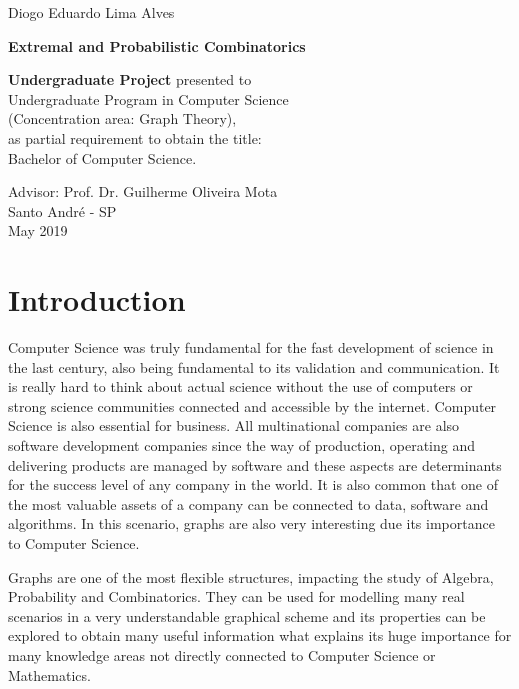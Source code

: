 \documentclass[12pt,twoside,a4paper,bibliography=totocnumbered]{book}
\numberwithin{equation}{section}
\theoremstyle{remark}
\begin{document}
\newpage
\begin{center}
Diogo Eduardo Lima Alves
\end{center}
   \begin{center}
        \vspace*{4 cm}
        \textbf{\Large{Extremal and Probabilistic Combinatorics}}\\
        \vspace*{5cm}
    \end{center}

    \begin{flushright}
{\bf Undergraduate Project} presented to\\ 
Undergraduate Program in Computer Science\\ 
(Concentration area: Graph Theory),\\ 
as partial requirement to obtain the title:\\ 
Bachelor of Computer Science.
    \end{flushright}

\vspace{3cm}
\begin{center}
Advisor: Prof. Dr. Guilherme Oliveira Mota\\
\vfill
Santo André - SP\\
May 2019
\end{center}

\tableofcontents

\listoffigures

\chapter{Introduction}
Computer Science was truly fundamental for the fast development of science in the last century, also being fundamental to its validation and communication. It is really hard to think about actual science without the use of computers or strong science communities connected and accessible by the internet. Computer Science is also essential for business. All multinational companies are also software development companies since the way of production, operating and delivering products are managed by software and these aspects are determinants for the success level of any company in the world. It is also common that one of the most valuable assets of a company can be connected to data, software and algorithms. In this scenario, graphs are also very interesting due its importance to Computer Science.

Graphs are one of the most flexible structures, impacting the study of Algebra, Probability and Combinatorics. They can be used for modelling many real scenarios in a very understandable graphical scheme and its properties can be explored to obtain many useful information what explains its huge importance for many knowledge areas not directly connected to Computer Science or Mathematics.   
\end{document}
